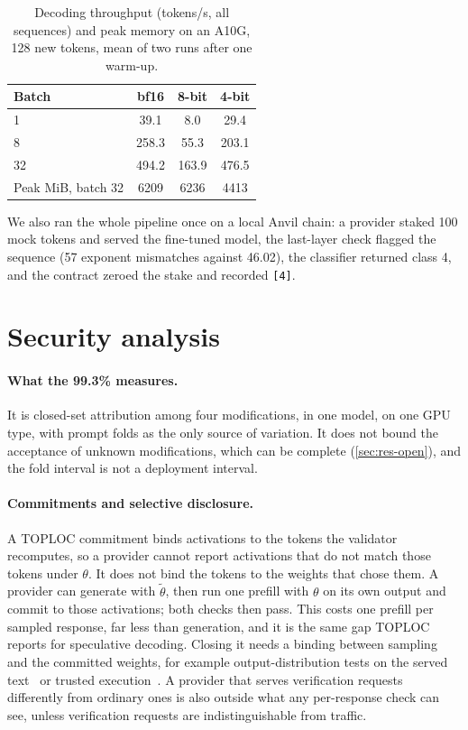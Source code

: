\documentclass[10pt,twocolumn]{article}
\begin{document}
\begin{table}[!htb]
\centering
\small
\caption{Decoding throughput (tokens/s, all sequences) and peak memory on an A10G, 128 new tokens, mean of two runs after one warm-up.}
\label{tab:throughput}
\begin{tabular}{@{}lccc@{}}
\toprule
Batch & bf16 & 8-bit & 4-bit \\
\midrule
1  & 39.1 & 8.0   & 29.4 \\
8  & 258.3 & 55.3 & 203.1 \\
32 & 494.2 & 163.9 & 476.5 \\
\midrule
Peak MiB, batch 32 & 6209 & 6236 & 4413 \\
\bottomrule
\end{tabular}
\end{table}


We also ran the whole pipeline once on a local Anvil chain: a provider staked 100 mock tokens and served the fine-tuned model, the last-layer check flagged the sequence (57 exponent mismatches against 46.02), the classifier returned class 4, and the contract zeroed the stake and recorded \texttt{[4]}.

\section{Security analysis}
\label{sec:security}

\paragraph{What the 99.3\% measures.}
It is closed-set attribution among four modifications, in one model, on one GPU type, with prompt folds as the only source of variation.
It does not bound the acceptance of unknown modifications, which can be complete (\cref{sec:res-open}), and the fold interval is not a deployment interval.

\paragraph{Commitments and selective disclosure.}
A TOPLOC commitment binds activations to the tokens the validator recomputes, so a provider cannot report activations that do not match those tokens under $\theta$.
It does not bind the tokens to the weights that chose them.
A provider can generate with $\tilde\theta$, then run one prefill with $\theta$ on its own output and commit to those activations; both checks then pass.
This costs one prefill per sampled response, far less than generation, and it is the same gap TOPLOC reports for speculative decoding.
Closing it needs a binding between sampling and the committed weights, for example output-distribution tests on the served text~\cite{gao2025model} or trusted execution~\cite{cai2025auditing}.
A provider that serves verification requests differently from ordinary ones is also outside what any per-response check can see, unless verification requests are indistinguishable from traffic.
\end{document}
